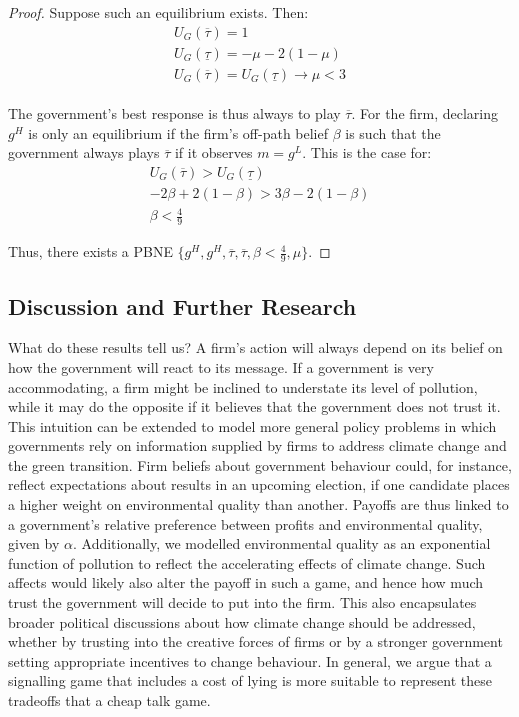 \documentclass{article}
\begin{document}
\begin{proof}
    Suppose such an equilibrium exists. Then:
    \begin{align*}
        U_G(\overline{\tau}) = 1 \\
        U_G(\underline{\tau}) = -\mu -2(1-\mu) \\
        U_G(\overline{\tau}) = U_G(\underline{\tau}) \xrightarrow[]{} \mu < 3
    \end{align*}

    The government's best response is thus always to play $\overline{\tau}$. For the firm, declaring $g^H$ is only an equilibrium if the firm's off-path belief $\beta$ is such that the  government always plays $\overline{\tau}$ if it observes $m = g^L$. This is the case for:
    \begin{align*}
       U_G(\overline{\tau}) > U_G(\underline{\tau}) \\
       -2\beta + 2(1-\beta) > 3\beta -2(1-\beta) \\
       \beta < \frac{4}{9}
    \end{align*}

    Thus, there exists a PBNE $\{g^H, g^H, \overline{\tau}, \overline{\tau}, \beta < \frac{4}{9}, \mu\}$.
\end{proof}
\vspace{0.5cm}

\subsection{Discussion and Further Research}

What do these results tell us? A firm's action will always depend on its belief on how the government will react to its message.  If a government is very accommodating, a firm might be inclined to understate its level of pollution, while it may do the opposite if it believes that the government does not trust it. This intuition can be extended to model more general policy problems in which governments rely on information supplied by firms to address climate change and the green transition. Firm beliefs about government behaviour could, for instance, reflect expectations about results in an upcoming election, if one candidate places a higher weight on environmental quality than another. Payoffs are thus linked to a government's relative preference between profits and environmental quality, given by $\alpha$. Additionally, we modelled environmental quality as an exponential function of pollution to reflect the accelerating effects of climate change. Such affects would likely also alter the payoff in such a game, and hence how much trust the government will decide to put into  the firm. This also encapsulates broader political discussions about how climate change should be addressed, whether by trusting into the creative forces of firms or by a stronger government setting appropriate incentives to change behaviour. In general, we argue that a signalling game that includes a cost of lying is more suitable to represent these  tradeoffs that a cheap talk game.\\
\end{document}
